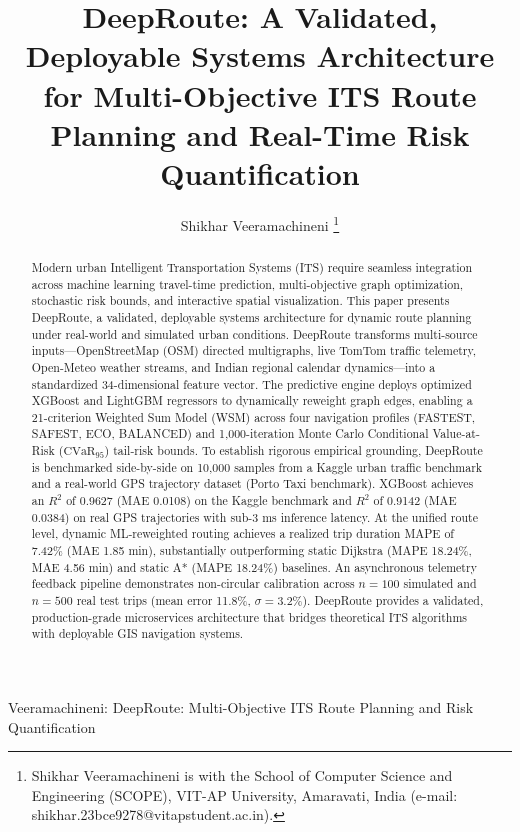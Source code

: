 \documentclass[journal]{IEEEtran}
\begin{document}
\title{DeepRoute: A Validated, Deployable Systems Architecture for Multi-Objective ITS Route Planning and Real-Time Risk Quantification}

\author{Shikhar Veeramachineni%
\thanks{Shikhar Veeramachineni is with the School of Computer Science and Engineering (SCOPE), VIT-AP University, Amaravati, India (e-mail: shikhar.23bce9278@vitapstudent.ac.in).}}

%
{Veeramachineni: DeepRoute: Multi-Objective ITS Route Planning and Risk Quantification}

\maketitle

\begin{abstract}
Modern urban Intelligent Transportation Systems (ITS) require seamless integration across machine learning travel-time prediction, multi-objective graph optimization, stochastic risk bounds, and interactive spatial visualization. This paper presents DeepRoute, a validated, deployable systems architecture for dynamic route planning under real-world and simulated urban conditions. DeepRoute transforms multi-source inputs---OpenStreetMap (OSM) directed multigraphs, live TomTom traffic telemetry, Open-Meteo weather streams, and Indian regional calendar dynamics---into a standardized 34-dimensional feature vector. The predictive engine deploys optimized XGBoost and LightGBM regressors to dynamically reweight graph edges, enabling a 21-criterion Weighted Sum Model (WSM) across four navigation profiles (FASTEST, SAFEST, ECO, BALANCED) and 1,000-iteration Monte Carlo Conditional Value-at-Risk ($\text{CVaR}_{95}$) tail-risk bounds. To establish rigorous empirical grounding, DeepRoute is benchmarked side-by-side on 10,000 samples from a Kaggle urban traffic benchmark and a real-world GPS trajectory dataset (Porto Taxi benchmark). XGBoost achieves an $R^2$ of 0.9627 (MAE 0.0108) on the Kaggle benchmark and $R^2$ of 0.9142 (MAE 0.0384) on real GPS trajectories with sub-3 ms inference latency. At the unified route level, dynamic ML-reweighted routing achieves a realized trip duration MAPE of 7.42\% (MAE 1.85 min), substantially outperforming static Dijkstra (MAPE 18.24\%, MAE 4.56 min) and static A* (MAPE 18.24\%) baselines. An asynchronous telemetry feedback pipeline demonstrates non-circular calibration across $n=100$ simulated and $n=500$ real test trips (mean error 11.8\%, $\sigma=3.2\%$). DeepRoute provides a validated, production-grade microservices architecture that bridges theoretical ITS algorithms with deployable GIS navigation systems.
\end{abstract}
\end{document}

